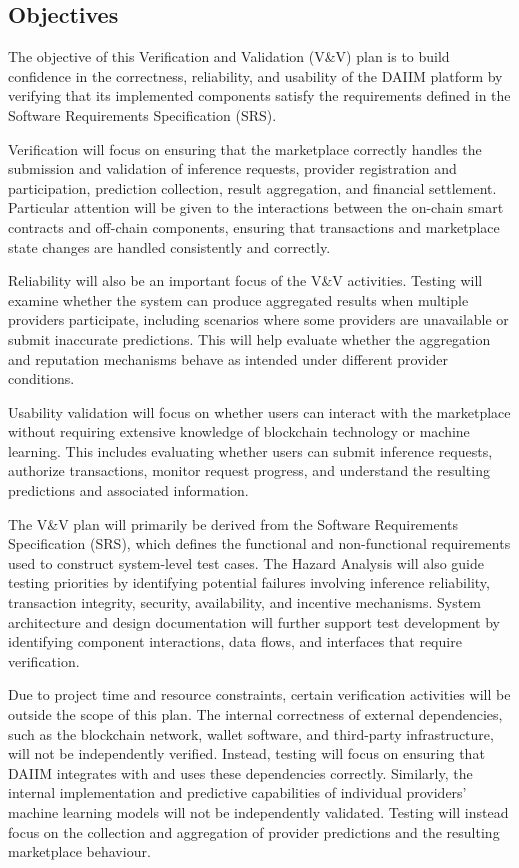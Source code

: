\documentclass[12pt]{article}
\begin{document}
\subsection{Objectives}

The objective of this Verification and Validation (V\&V) plan is to build confidence in the correctness, reliability, and usability of the DAIIM platform by verifying that its implemented components satisfy the requirements defined in the Software Requirements Specification (SRS).

Verification will focus on ensuring that the marketplace correctly handles the submission and validation of inference requests, provider registration and participation, prediction collection, result aggregation, and financial settlement. Particular attention will be given to the interactions between the on-chain smart contracts and off-chain components, ensuring that transactions and marketplace state changes are handled consistently and correctly.


Reliability will also be an important focus of the V\&V activities. Testing will examine whether the system can produce aggregated results when multiple providers participate, including scenarios where some providers are unavailable or submit inaccurate predictions. This will help evaluate whether the aggregation and reputation mechanisms behave as intended under different provider conditions.

Usability validation will focus on whether users can interact with the marketplace without requiring extensive knowledge of blockchain technology or machine learning. This includes evaluating whether users can submit inference requests, authorize transactions, monitor request progress, and understand the resulting predictions and associated information.

The V\&V plan will primarily be derived from the Software Requirements Specification (SRS), which defines the functional and non-functional requirements used to construct system-level test cases. The Hazard Analysis will also guide testing priorities by identifying potential failures involving inference reliability, transaction integrity, security, availability, and incentive mechanisms. System architecture and design documentation will further support test development by identifying component interactions, data flows, and interfaces that require verification.

Due to project time and resource constraints, certain verification activities will be outside the scope of this plan. The internal correctness of external dependencies, such as the blockchain network, wallet software, and third-party infrastructure, will not be independently verified. Instead, testing will focus on ensuring that DAIIM integrates with and uses these dependencies correctly. Similarly, the internal implementation and predictive capabilities of individual providers' machine learning models will not be independently validated. Testing will instead focus on the collection and aggregation of provider predictions and the resulting marketplace behaviour.
\end{document}
